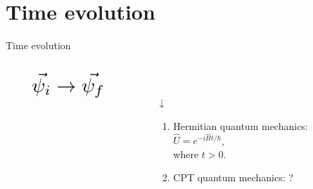 \documentclass[10pt]{beamer}
\newcommand*{\Scale}[2][4]{\scalebox{#1}{\ensuremath{#2}}}%
\begin{document}
\section{Time evolution}
\begin{frame}{Time evolution}
\vspace{-1cm}
\hspace{-2em}
\vspace{2cm}
\begin{columns}[T]
    \begin{column}{0.3\textwidth}
    \vspace{-2cm}
    \begin{align*}
    &\Scale[2]{\vec{\psi_{i}} \rightarrow{} \vec{\psi_{f}}}
    \end{align*}
    \pause
    \hspace{6em}
    \Scale[2.2]{\hookrightarrow}
    \end{column}
    
    \begin{column}{0.8\textwidth}
    \vspace{-1.3cm}
    \Scale[3]{\vec{\psi_{f}} = \hat{U} \vec{\psi_{i}}}\\
    \pause
    \hspace{6.8em}
    \begin{huge}
    {$\downarrow$}\\
    \end{huge}
    \begin{enumerate}
    \item \textcolor{myNewColorA}{Hermitian} quantum mechanics:\\
    \hspace{5em}
    $\hat{U} = e^{-i\hat{H}t / \hbar}$,\\
    \hspace{5em}
    where $t > 0$.
    \vspace{0.3cm}
    \pause
    \item \textcolor{myNewColorC}{CPT} quantum mechanics: \textcolor{myNewColorC}{\large{?}}
    \end{enumerate}
    \pause
    \vspace{0.7cm}
    \end{column}
    \end{columns}
\end{frame}
\end{document}
